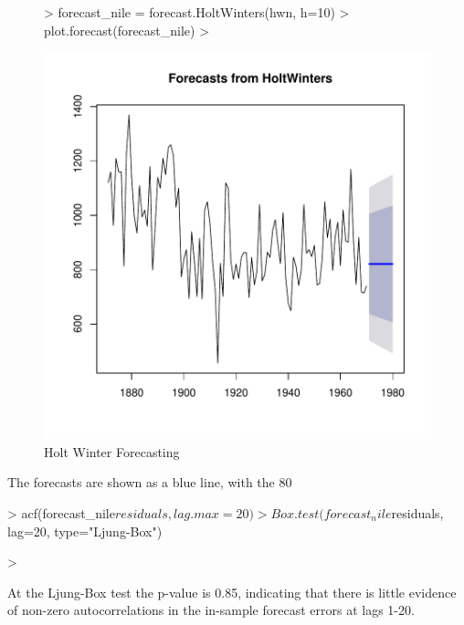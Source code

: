 \documentclass[11pt, a4paper]{article} %
\begin{document}
\begin{figure}
\centering
\begin{Schunk}
\begin{Sinput}
> forecast_nile = forecast.HoltWinters(hwn, h=10)
> plot.forecast(forecast_nile)
> 
\end{Sinput}
\end{Schunk}
\includegraphics{alles-038}
\caption{Holt Winter Forecasting}
\end{figure}

\noindent The forecasts are shown as a blue line, with the 80%


\begin{Schunk}
\begin{Sinput}
> acf(forecast_nile$residuals, lag.max = 20)
> Box.test(forecast_nile$residuals, lag=20, type="Ljung-Box")
\end{Sinput}
\begin{Sinput}
> 
\end{Sinput}
\end{Schunk}
\noindent At the Ljung-Box test the p-value is 0.85, indicating that there is little evidence of non-zero autocorrelations in the in-sample forecast errors at lags 1-20.
\end{document}
